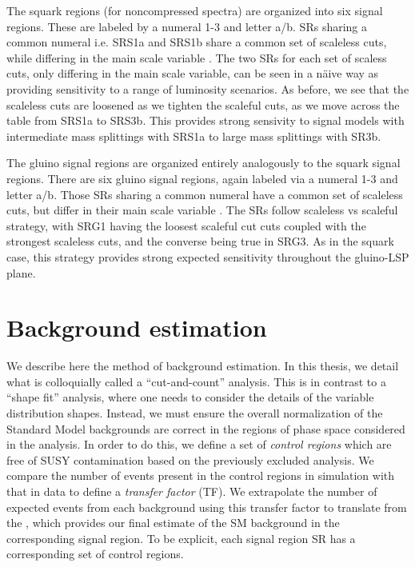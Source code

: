 The squark regions (for noncompressed spectra) are organized into six signal regions.
These are labeled by a numeral 1-3 and letter a/b.
SRs sharing a common numeral i.e. SRS1a and SRS1b share a common set of scaleless cuts, while differing in the main scale variable .
The two SRs for each set of scaless cuts, only differing in the main scale variable, can be seen in a n{\"a}ive way as providing sensitivity to a range of luminosity scenarios\footnotemark.
As before, we see that the scaleless cuts are loosened as we tighten the scaleful cuts, as we move across the table from SRS1a to SRS3b.
This provides strong sensivity to signal models with intermediate mass splittings with SRS1a to large mass splittings with SR3b.

The gluino signal regions are organized entirely analogously to the squark signal regions.
There are six gluino signal regions, again labeled via a numeral 1-3 and letter a/b.
Those SRs sharing a common numeral have a common set of scaleless cuts, but differ in their main scale variable .
The SRs follow scaleless vs scaleful strategy, with SRG1 having the loosest scaleful cut cuts coupled with the strongest scaleless cuts, and the converse being true in SRG3.
As in the squark case, this strategy provides strong expected sensitivity throughout the gluino-LSP plane.



\section{Background estimation}

We describe here the method of background estimation.
In this thesis, we detail what is colloquially called a ``cut-and-count'' analysis.
This is in contrast to a ``shape fit'' analysis, where one needs to consider the details of the variable distribution shapes.
Instead, we must ensure the overall normalization of the Standard Model backgrounds are correct in the regions of phase space considered in the analysis.
In order to do this, we define a set of \textit{control regions} which are free of SUSY contamination based on the previously excluded analysis.
We compare the number of events present in the control regions in simulation with that in data to define a \textit{transfer factor} (TF).
We extrapolate the number of expected events from each background using this transfer factor to translate from the , which provides our final estimate of the SM background in the corresponding signal region.
To be explicit, each signal region SR has a corresponding set of control regions.

